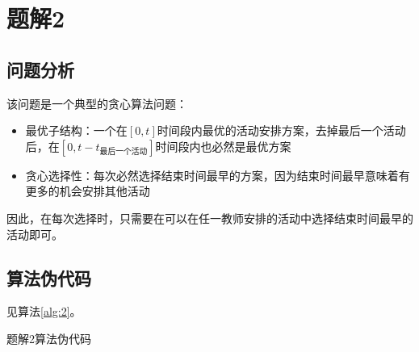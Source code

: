 \section{题解2}
\subsection{问题分析}
该问题是一个典型的贪心算法问题：
\begin{itemize}
    \item 最优子结构：一个在$[0,t]$时间段内最优的活动安排方案，去掉最后一个活动后，在$[0,t-t_\text{最后一个活动}]$时间段内也必然是最优方案
    \item 贪心选择性：每次必然选择结束时间最早的方案，因为结束时间最早意味着有更多的机会安排其他活动
\end{itemize}
因此，在每次选择时，只需要在可以在任一教师安排的活动中选择结束时间最早的活动即可。

\subsection{算法伪代码}
见算法\ref{alg:2}。
\begin{algorithm}[htbp]
\caption{题解2算法伪代码}\label{alg:2}
\end{algorithm}